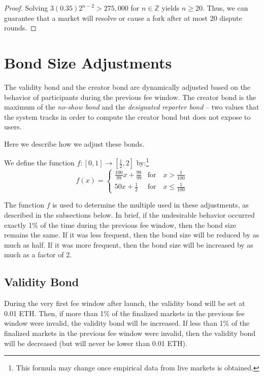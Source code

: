 \documentclass[floatfix,reprint,nofootinbib,amsmath,amssymb,epsfig,pre,floats,letterpaper,groupedaffiliation]{revtex4-1}
\newcommand{\beq}{\begin{equation}}
\newcommand{\eeq}{\end{equation}}
\theoremstyle{definition}
\theoremstyle{definition}
\begin{document}
\begin{appendix}
\begin{proof}
Solving $3(0.35)2^{n-2}>275,000$ for $n \in \mathbb{Z}$ yields $n \geq 20$.  Thus, we can guarantee that a market will resolve or cause a fork after at most 20 dispute rounds.
\end{proof}


\section{Bond Size Adjustments}\label{section:bond_size_adjustment_details}

The validity bond and the creator bond are dynamically adjusted based on the behavior of participants during the previous fee window. The creator bond is the maximum of the \textit{no-show bond} and the \textit{designated reporter bond} -- two values that the system tracks in order to compute the creator bond but does not expose to users.

Here we describe how we adjust these bonds.

We define the function $f: [0, 1] \rightarrow [\frac{1}{2}, 2]$ by:\footnote{This formula may change once empirical data from live markets is obtained.}
\beq\label{eq:validity_bond_adjustment}
f(x) = \begin{cases} 
    \frac{100}{99} x + \frac{98}{99} & \text{for}\quad x > \frac{1}{100} \\
    50x + \frac{1}{2} & \text{for}\quad x \leq \frac{1}{100}
\end{cases}
\eeq

The function $f$ is used to determine the multiple used in these adjustments, as described in the subsections below. In brief, if the undesirable behavior occurred exactly 1\% of the time during the previous fee window, then the bond size remains the same. If it was less frequent, then the bond size will be reduced by as much as half. If it was more frequent, then the bond size will be increased by as much as a factor of 2.

\subsection{Validity Bond}\label{section:bond_size_adjustment_details_validity_bonds}

During the very first fee window after launch, the validity bond will be set at 0.01 ETH. Then, if more than 1\% of the finalized markets in the previous fee window were invalid, the validity bond will be increased.  If less than 1\% of the finalized markets in the previous fee window were invalid, then the validity bond will be decreased (but will never be lower than 0.01 ETH).


\end{appendix}
\end{document}
